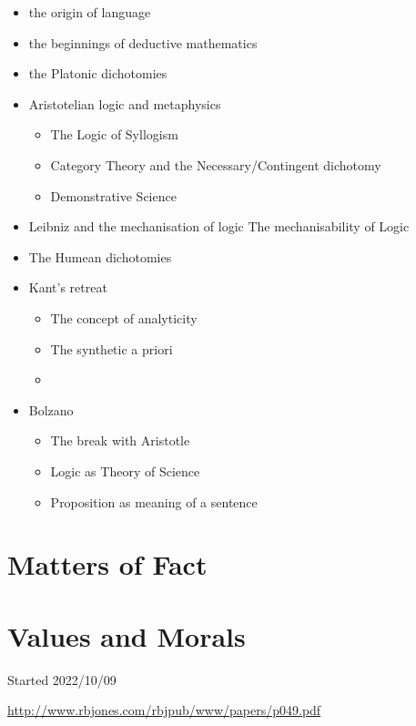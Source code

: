\documentclass[10pt,titlepage]{article}
\begin{document}
\begin{itemize}
\item the origin of language
\item the beginnings of deductive mathematics
\item the Platonic dichotomies
\item Aristotelian logic and metaphysics
  \begin{itemize}
\item  The Logic of Syllogism
\item  Category Theory and the Necessary/Contingent dichotomy
\item  Demonstrative Science
  \end{itemize}
\item Leibniz and the mechanisation of logic
  The mechanisability of Logic
\item The Humean dichotomies
\item Kant's retreat
  \begin{itemize}
\item   The concept of analyticity
\item   The synthetic a priori
\item   \end{itemize}
\item Bolzano
  \begin{itemize}
\item   The break with Aristotle
\item   Logic as Theory of Science
\item   Proposition as meaning of a sentence
\end{itemize}

\end{itemize}

\section{Matters of Fact}


\section{Values and Morals}


{}





\tiny{
Started 2022/10/09

\href{http://www.rbjones.com/rbjpub/www/papers/p049.pdf}{http://www.rbjones.com/rbjpub/www/papers/p049.pdf}

}%
\end{document}
